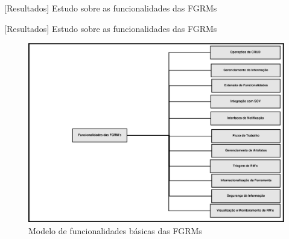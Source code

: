 \documentclass[t,14pt,mathserif]{beamer}
\begin{document}
\begin{frame}{[Resultados] Estudo sobre as funcionalidades das FGRMs}

    \begin{table}[htpb]
    \centering
    \caption{Ferramentas utilizados no estudo sobre funcionalidades das FGRMs}
\label{tab:ferramenta_utilizadas_estudo}
    \end{table}

\end{frame}

\begin{frame}{[Resultados] Estudo sobre as funcionalidades das FGRMs}

    \begin{figure}[htpb]
        \centering
        \includegraphics[width=.8\linewidth]{../img/diagrama-espectro-funcionalidades-fgrm.eps}
        \caption{Modelo de funcionalidades básicas das FGRMs}
\label{fig:diagrama-espectro-funcionalidades-fgrm}
    \end{figure}

\end{frame}
\end{document}
